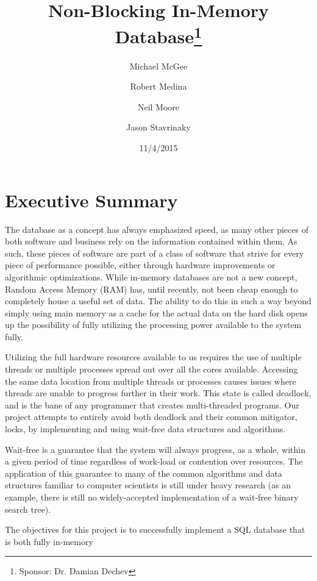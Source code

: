 \documentclass[letterpaper, 11pt]{article}
\title{Non-Blocking In-Memory Database\thanks{Sponsor: Dr. Damian Dechev}}
\author{Michael McGee \and Robert Medina \and Neil Moore \and Jason Stavrinaky}
\date{11/4/2015}
\begin{document}
\maketitle
\newpage

\tableofcontents
\newpage


\section{Executive Summary}
The database as a concept has always emphasized speed, as many other pieces of both software
and business rely on the information contained within them. As such, these pieces of software
are part of a class of software that strive for every piece of performance possible, either through
hardware improvements or algorithmic optimizations. While in-memory databases are not a new concept,
Random Access Memory (RAM) has, until recently, not been cheap enough to completely house a useful
set of data. The ability to do this in such a way beyond simply using main memory as a cache for the
actual data on the hard disk opens up the possibility of fully utilizing the processing power
available to the system fully.
\par\vspace{\baselineskip}
Utilizing the full hardware resources available to us requires the use of multiple threads or
multiple processes spread out over all the cores available. Accessing the same data location
from multiple threads or processes causes issues where threads are unable to progress further in their
work. This state is called deadlock, and is the bane of any programmer that creates multi-threaded
programs. Our project attempts to entirely avoid both deadlock and their common mitigator, locks,
by implementing and using wait-free data structures and algorithms.
\par\vspace{\baselineskip}
Wait-free is a guarantee that the system will always progress, as a whole, within a given period of time
regardless of work-load or contention over resources. The application of this guarantee to many
of the common algorithms and data structures familiar to computer scientists is still under heavy research
(as an example, there is still no widely-accepted implementation of a wait-free binary search tree).
\par\vspace{\baselineskip}
The objectives for this project is to successfully implement a SQL database that is both fully in-memory
\end{document}

